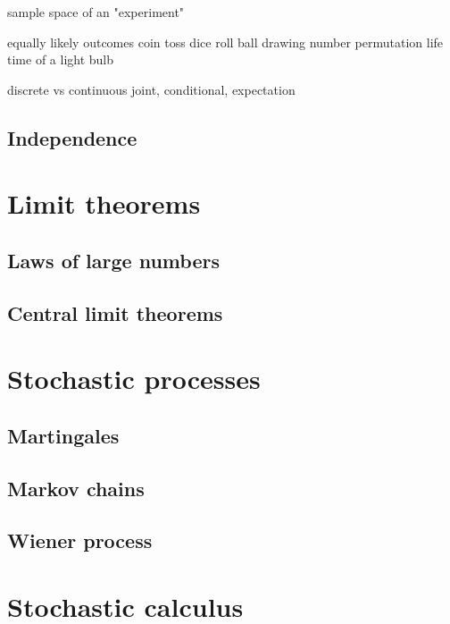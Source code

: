 \documentclass{../note}
\begin{document}
sample space of an "experiment"

equally likely outcomes
	coin toss
	dice roll
	ball drawing
	number permutation
	life time of a light bulb


discrete vs continuous
joint, conditional, expectation

\chapter{Independence}





















\part{Limit theorems}
\chapter{Laws of large numbers}
\chapter{Central limit theorems}
\chapter{}

\part{Stochastic processes}
\chapter{Martingales}
\chapter{Markov chains}
\chapter{Wiener process}

\part{Stochastic calculus}
\end{document}
